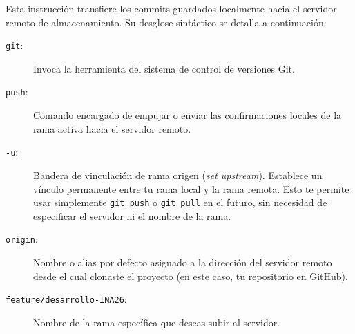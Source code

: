 \documentclass[
10pt, %
a4paper, %
oneside, %
headinclude,footinclude, %
BCOR5mm, %
]{scrartcl}
\begin{document}
Esta instrucción transfiere los commits guardados localmente hacia el servidor remoto de almacenamiento. Su desglose sintáctico se detalla a continuación:

\begin{description}
	\item[\texttt{git}:] Invoca la herramienta del sistema de control de versiones Git.
	\item[\texttt{push}:] Comando encargado de empujar o enviar las confirmaciones locales de la rama activa hacia el servidor remoto.
	\item[\texttt{-u}:] Bandera de vinculación de rama origen (\textit{set upstream}). Establece un vínculo permanente entre tu rama local y la rama remota. Esto te permite usar simplemente \texttt{git push} o \texttt{git pull} en el futuro, sin necesidad de especificar el servidor ni el nombre de la rama.
	\item[\texttt{origin}:] Nombre o alias por defecto asignado a la dirección del servidor remoto desde el cual clonaste el proyecto (en este caso, tu repositorio en GitHub).
	\item[\texttt{feature/desarrollo-INA26}:] Nombre de la rama específica que deseas subir al servidor.
\end{description}



%


\end{document}
